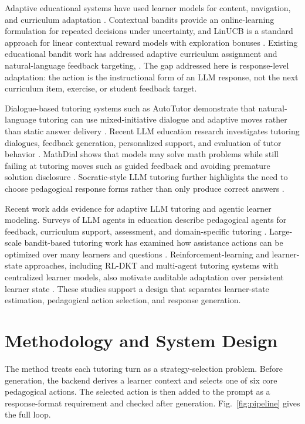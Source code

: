 \documentclass[conference]{IEEEtran}
\begin{document}
Adaptive educational systems have used learner models for content, navigation, and curriculum adaptation . Contextual bandits provide an online-learning formulation for repeated decisions under uncertainty, and LinUCB is a standard approach for linear contextual reward models with exploration bonuses . Existing educational bandit work has addressed adaptive curriculum assignment and natural-language feedback targeting, . The gap addressed here is response-level adaptation: the action is the instructional form of an LLM response, not the next curriculum item, exercise, or student feedback target.

Dialogue-based tutoring systems such as AutoTutor demonstrate that natural-language tutoring can use mixed-initiative dialogue and adaptive moves rather than static answer delivery . Recent LLM education research investigates tutoring dialogues, feedback generation, personalized support, and evaluation of tutor behavior . MathDial shows that models may solve math problems while still failing at tutoring moves such as guided feedback and avoiding premature solution disclosure . Socratic-style LLM tutoring further highlights the need to choose pedagogical response forms rather than only produce correct answers .

Recent work adds evidence for adaptive LLM tutoring and agentic learner modeling. Surveys of LLM agents in education describe pedagogical agents for feedback, curriculum support, assessment, and domain-specific tutoring . Large-scale bandit-based tutoring work has examined how assistance actions can be optimized over many learners and questions . Reinforcement-learning and learner-state approaches, including RL-DKT and multi-agent tutoring systems with centralized learner models, also motivate auditable adaptation over persistent learner state . These studies support a design that separates learner-state estimation, pedagogical action selection, and response generation.

\section{Methodology and System Design}

The method treats each tutoring turn as a strategy-selection problem. Before generation, the backend derives a learner context and selects one of six core pedagogical actions. The selected action is then added to the prompt as a response-format requirement and checked after generation. Fig.~\ref{fig:pipeline} gives the full loop.
\end{document}
